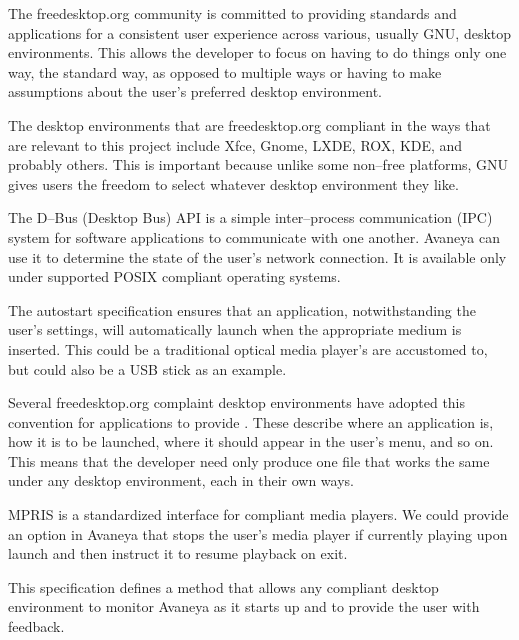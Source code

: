 

The freedesktop.org community is committed to providing standards and applications for a consistent user experience across various, usually GNU, desktop environments. This allows the developer to focus on having to do things only one way, the standard way, as opposed to multiple ways or having to make assumptions about the user's preferred desktop environment. 

The desktop environments that are freedesktop.org compliant in the ways that are relevant to this project include Xfce, Gnome, LXDE, ROX, KDE, and probably others. This is important because unlike some non--free platforms, GNU gives users the freedom to select whatever desktop environment they like.

\startitemize[4]

The D--Bus (Desktop Bus) API is a simple inter--process communication (IPC) system for software applications to communicate with one another. Avaneya can use it to determine the state of the user's network connection. It is available only under supported POSIX compliant operating systems.


The autostart specification ensures that an application, notwithstanding the user's settings, will automatically launch when the appropriate medium is inserted. This could be a traditional optical media player's are accustomed to, but could also be a USB stick as an example.


Several freedesktop.org complaint desktop environments have adopted this convention for applications to provide . These describe where an application is, how it is to be launched, where it should appear in the user's menu, and so on. This means that the developer need only produce one file that works the same under any desktop environment, each in their own ways.


MPRIS is a standardized interface for compliant media players. We could provide an option in Avaneya that stops the user's media player if currently playing upon launch and then instruct it to resume playback on exit.


This specification defines a method that allows any compliant desktop environment to monitor Avaneya as it starts up and to provide the user with feedback.
\stopitemize

